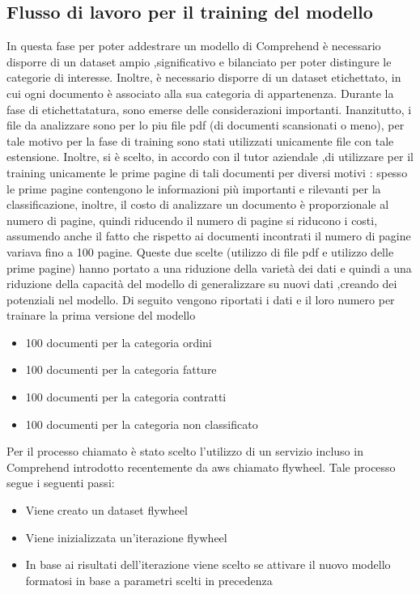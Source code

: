 \subsection{Flusso di lavoro per il training del modello}
\label{subsec:training-modello}
In questa fase per poter addestrare un modello di Comprehend è necessario disporre di un dataset ampio ,significativo e bilanciato per poter distingure le categorie di interesse. Inoltre, è necessario disporre di un dataset etichettato, in cui ogni documento è associato alla sua categoria di appartenenza. Durante la fase di etichettatatura, sono emerse delle considerazioni importanti. Inanzitutto, i file da analizzare sono per lo piu file pdf (di documenti scansionati o meno), per tale motivo per la fase di training sono stati utilizzati unicamente file con tale estensione. Inoltre, si è scelto, in accordo con il tutor aziendale ,di utilizzare per il training unicamente le prime pagine di tali documenti per diversi motivi : spesso le prime pagine contengono le informazioni più importanti e rilevanti per la classificazione, inoltre, il costo di analizzare un documento è proporzionale al numero di pagine, quindi riducendo il numero di pagine si riducono i costi, assumendo anche il fatto che rispetto ai documenti incontrati il numero di pagine variava fino a 100 pagine. Queste due scelte (utilizzo di file pdf e utilizzo delle prime pagine) hanno portato a una riduzione della varietà dei dati e quindi a una riduzione della capacità del modello di generalizzare su nuovi dati ,creando dei potenziali  nel modello. Di seguito vengono riportati i dati e il loro numero per trainare la prima versione del modello
\begin{itemize}
    \item 100 documenti per la categoria ordini
    \item 100 documenti per la categoria fatture
    \item 100 documenti per la categoria contratti
    \item 100 documenti per la categoria non classificato
\end{itemize}
Per il processo chiamato  è stato scelto l'utilizzo di un servizio incluso in Comprehend introdotto recentemente da aws chiamato flywheel.
Tale processo segue i seguenti passi:
\begin{itemize}
    \item Viene creato un dataset flywheel
    \item Viene inizializzata un'iterazione flywheel
    \item In base ai risultati dell'iterazione viene scelto se attivare il nuovo modello formatosi in base a parametri scelti in precedenza
\end{itemize}
